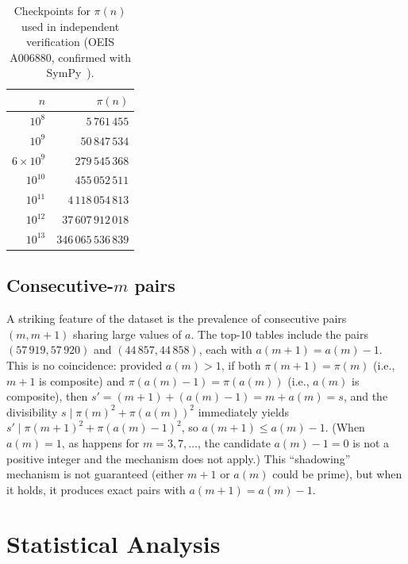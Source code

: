 \documentclass{amsart}
\theoremstyle{definition}
\theoremstyle{remark}
\numberwithin{equation}{section}
\begin{document}
\begin{table}[ht]
\centering
\caption{Checkpoints for $\pi(n)$ used in independent verification
(OEIS A006880, confirmed with SymPy~\cite{SymPy}).}
\label{tab:pi_checkpoints}
\begin{tabular}{rr}
\toprule
$n$ & $\pi(n)$ \\
\midrule
$10^{8}$ & $5\,761\,455$ \\
$10^{9}$ & $50\,847\,534$ \\
$6 \times 10^{9}$ & $279\,545\,368$ \\
$10^{10}$ & $455\,052\,511$ \\
$10^{11}$ & $4\,118\,054\,813$ \\
$10^{12}$ & $37\,607\,912\,018$ \\
$10^{13}$ & $346\,065\,536\,839$ \\
\bottomrule
\end{tabular}
\end{table}

\subsection{Consecutive-$m$ pairs}

A striking feature of the dataset is the prevalence of consecutive
pairs $(m, m+1)$ sharing large values of $a$.  The top-10 tables
include the pairs $(57\,919, 57\,920)$ and $(44\,857, 44\,858)$,
each with $a(m+1) = a(m) - 1$.  This is no coincidence: provided
$a(m) > 1$, if both $\pi(m+1) = \pi(m)$ (i.e., $m+1$ is composite)
and $\pi(a(m)-1) = \pi(a(m))$ (i.e., $a(m)$ is composite), then
$s' = (m+1) + (a(m)-1) = m + a(m) = s$, and the divisibility
$s \mid \pi(m)^2 + \pi(a(m))^2$ immediately yields
$s' \mid \pi(m+1)^2 + \pi(a(m)-1)^2$, so
$a(m+1) \le a(m) - 1$.
(When $a(m) = 1$, as happens for $m = 3, 7, \ldots$, the candidate
$a(m) - 1 = 0$ is not a positive integer and the mechanism does
not apply.)
This ``shadowing'' mechanism is not guaranteed (either $m+1$ or
$a(m)$ could be prime), but when it holds, it produces
exact pairs with $a(m+1) = a(m) - 1$.

\section{Statistical Analysis}
\label{sec:statistics}
\end{document}
